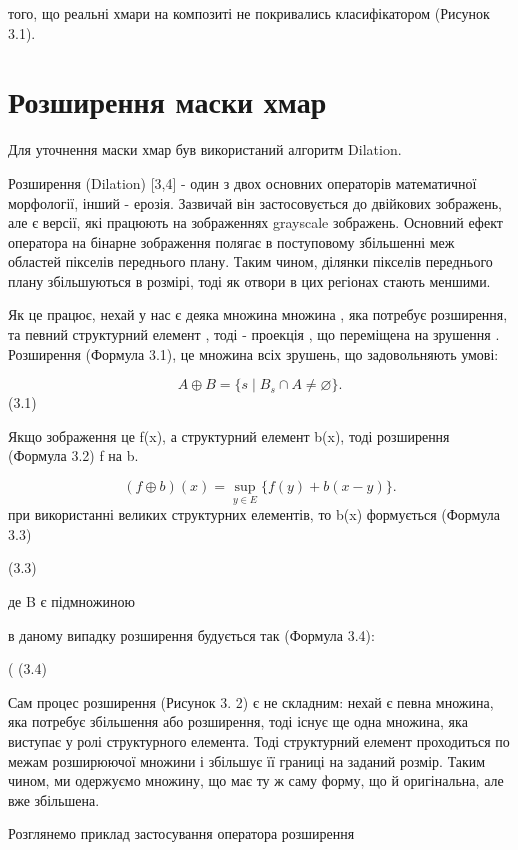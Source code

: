 того, що реальні хмари на композиті не покривались класифікатором (Рисунок 3.1).

\section{Розширення маски хмар}
Для уточнення маски хмар був використаний алгоритм Dilation.

Розширення (Dilation) [3,4] - один з двох основних операторів математичної морфології, інший - ерозія. Зазвичай він застосовується до двійкових зображень, але є версії, які працюють на зображеннях grayscale зображень. Основний ефект оператора на бінарне зображення полягає в поступовому збільшенні меж областей пікселів переднього плану. Таким чином, ділянки пікселів переднього плану збільшуються в розмірі, тоді як отвори в цих регіонах стають меншими.

Як це працює, нехай у нас є деяка множина множина , яка потребує розширення, та певний структурний елемент , тоді - проекція , що переміщена на зрушення . Розширення (Формула 3.1), це множина всіх зрушень, що задовольняють умові:

\begin{equation}\label{eq:dilation}A\oplus B=\{s\mid B_s\cap A\ne\varnothing\}.\end{equation}
(3.1)

Якщо зображення це f(x), а структурний елемент b(x), тоді розширення (Формула 3.2) f на b.

\begin{equation}\label{eq:dilation-function}(f\oplus b)(x)=\sup_{y\in E}\{f(y)+b(x-y)\}.\end{equation}
при використанні великих структурних елементів, то b(x) формується (Формула 3.3)

(3.3)

де B є підмножиною

в даному випадку розширення будується так (Формула 3.4):

( (3.4)

Сам процес розширення (Рисунок 3. 2) є не складним: нехай є певна множина, яка потребує збільшення або розширення, тоді існує ще одна множина, яка виступає у ролі структурного елемента. Тоді структурний елемент проходиться по межам розширюючої множини і збільшує її границі на заданий розмір. Таким чином, ми одержуємо множину, що має ту ж саму форму, що й оригінальна, але вже збільшена.

Розглянемо приклад застосування оператора розширення

